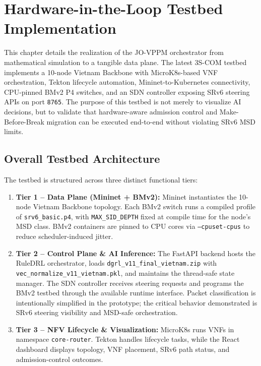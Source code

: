 \documentclass[12pt, a4paper, reqno, oneside]{book}
\begin{document}
\chapter{Hardware-in-the-Loop Testbed Implementation}
\label{chap:testbed}

This chapter details the realization of the JO-VPPM orchestrator from mathematical simulation to a tangible data plane. The latest 3S-COM testbed implements a 10-node Vietnam Backbone with MicroK8s-based VNF orchestration, Tekton lifecycle automation, Mininet-to-Kubernetes connectivity, CPU-pinned BMv2 P4 switches, and an SDN controller exposing SRv6 steering APIs on port \texttt{8765}. The purpose of this testbed is not merely to visualize AI decisions, but to validate that hardware-aware admission control and Make-Before-Break migration can be executed end-to-end without violating SRv6 MSD limits.

\section{Overall Testbed Architecture}
The testbed is structured across three distinct functional tiers:
\begin{enumerate}
    \item \textbf{Tier 1 -- Data Plane (Mininet + BMv2):} Mininet instantiates the 10-node Vietnam Backbone topology. Each BMv2 switch runs a compiled profile of \texttt{srv6\_basic.p4}, with \texttt{MAX\_SID\_DEPTH} fixed at compile time for the node's MSD class. BMv2 containers are pinned to CPU cores via \texttt{--cpuset-cpus} to reduce scheduler-induced jitter.
    \item \textbf{Tier 2 -- Control Plane \& AI Inference:} The FastAPI backend hosts the RuleDRL orchestrator, loads \texttt{dgrl\_v11\_final\_vietnam.zip} with \texttt{vec\_normalize\_v11\_vietnam.pkl}, and maintains the thread-safe state manager. The SDN controller receives steering requests and programs the BMv2 testbed through the available runtime interface. Packet classification is intentionally simplified in the prototype; the critical behavior demonstrated is SRv6 steering visibility and MSD-safe orchestration.
    \item \textbf{Tier 3 -- NFV Lifecycle \& Visualization:} MicroK8s runs VNFs in namespace \texttt{core-router}. Tekton handles lifecycle tasks, while the React dashboard displays topology, VNF placement, SRv6 path status, and admission-control outcomes.
\end{enumerate}
\end{document}
